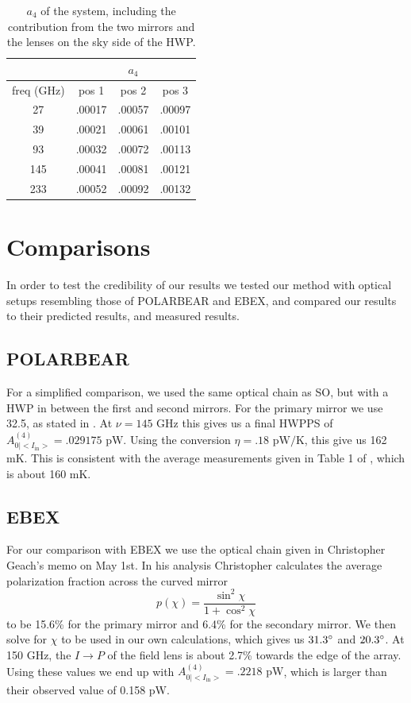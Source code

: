 \documentclass{article}
\theoremstyle{remark}
\newcommand{\tab}{\hspace*{2em}}
\renewcommand{\t}[1]{\text{#1}}
\newcommand{\AI}{A^{(4)}_{0|<I_{\t{in}}>}}
\newcommand{\ip}{$I\rightarrow P$ }
\begin{document}
\begin{table}
\centering
\begin{tabular}{ |c|c|c|c| } 
	\hline
	 & \multicolumn{3}{|c|}{$a_4$}\\
	\hline
	freq (GHz) & pos 1 	& pos 2 & pos 3 \\ \hline
	27 & .00017 & .00057 & .00097\\
	39 & .00021 & .00061 & .00101\\
	93 & .00032 & .00072 & .00113\\
	145 & .00041 & .00081 & .00121\\
	233 & .00052 & .00092 & .00132\\
	\hline	
\end{tabular}


\caption{ $a_4$ of the system, including the contribution from the two mirrors and the lenses on the sky side of the HWP.
}
\label{table:SO_a4}
\end{table}




\section*{Comparisons}

\tab In order to test the credibility of our results we tested our method with optical setups resembling those of POLARBEAR and EBEX,
and compared our results to their predicted results, and measured results. 

\subsection*{POLARBEAR}
\tab For a simplified comparison, we used the same optical chain as SO, but with a HWP in between the first and second mirrors.
For the primary mirror we use 32.5\degree, as stated in \cite{takakura_performance_2017}. At $\nu = 145 \t{ GHz}$ this gives us a final 
HWPPS of $\AI = .029175 \t{ pW}$. Using the conversion $\eta = .18 \t{ pW/K}$, this give us 162 mK.
This is consistent with the average measurements given in Table 1 of \cite{takakura_performance_2017}, which is about 160 mK.

\subsection*{EBEX}

\tab For our comparison with EBEX we use the optical chain given in Christopher Geach's memo on May 1st.
In his analysis Christopher calculates the average polarization fraction across the curved mirror
\[p(\chi) = \frac{\sin^2 \chi}{1 + \cos^2 \chi}\]
to be 15.6\% for the primary mirror and 6.4\% for the secondary mirror. 
We then solve for $\chi$ to be used in our own calculations, which gives us $31.3\degree$ and $20.3 \degree$.
At 150 GHz, the \ip of the field lens is about 2.7\% towards the edge of the array.
Using these values we end up with $\AI = .2218 \t{ pW}$, which is larger than their observed value of 0.158 pW.
\end{document}
